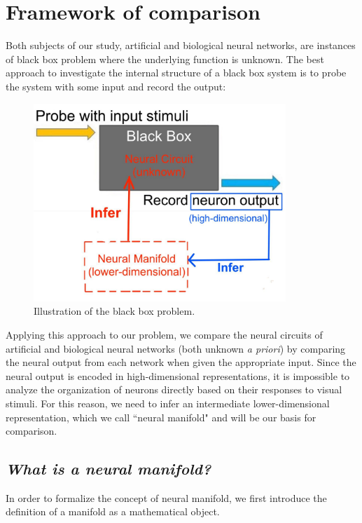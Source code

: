 \section{Framework of comparison}
\label{intro-framework}
Both subjects of our study, artificial and biological neural networks, are instances of black box problem where the underlying function is unknown. The best approach to investigate the internal structure of a black box system is to probe the system with some input and record the output:
\begin{figure}[H]
    \includegraphics[width=0.85\textwidth]{figures/intro/black-box.jpg}
    \caption{Illustration of the black box problem.}
\end{figure} 

Applying this approach to our problem, we compare the neural circuits of artificial and biological neural networks (both unknown \textit{a priori}) by comparing the neural output from each network when given the appropriate input. Since the neural output is encoded in high-dimensional representations, it is impossible to analyze the organization of neurons directly based on their responses to visual stimuli. For this reason, we need to infer an intermediate lower-dimensional representation, which we call ``neural manifold" and will be our basis for comparison. 

\subsection{ \textit{What is a neural manifold?}}
\par In order to formalize the concept of neural manifold, we first introduce the definition of a manifold as a mathematical object.

